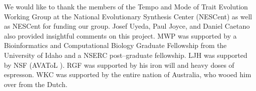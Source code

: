 \documentclass[a4paper,12pt]{article}
\begin{document}
We would like to thank the members of the Tempo and Mode of Trait Evolution Working Group at the National Evolutionary Synthesis Center (NESCent) as well as NESCent for funding our group. Josef Uyeda, Paul Joyce, and Daniel Caetano also provided insightful comments on this project. MWP was supported by a Bioinformatics and Computational Biology Graduate Fellowship from the University of Idaho and a NSERC post--graduate fellowship. LJH was supported by NSF (AVAToL ). RGF was supported by his iron will and heavy doses of espresson. WKC was supported by the entire nation of Australia, who wooed him over from the Dutch.



\newpage


\end{document}
